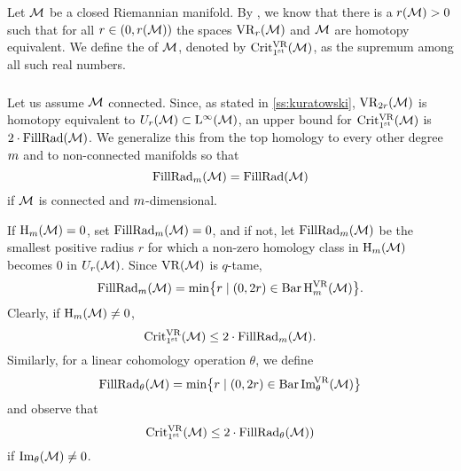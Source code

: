 \subsubsection{}\label{ss:first_critical_value}

Let \(\cM\) be a closed Riemannian manifold.
By \cite[Thm.3.5]{hausmann1995vietoris}, we know that there is a \(r(\cM) > 0\) such that for all \(r \in (0,r(\cM))\) the spaces \(\VR_r(\cM)\) and \(\cM\) are homotopy equivalent.
We define the  of \(\cM\), denoted by \(\crit(\cM)\), as the supremum among all such real numbers.


\subsubsection{}
\label{subsub:beta v.s. fillrad}

Let us assume \(\cM\) connected.
Since, as stated in \cref{ss:kuratowski}, \(\VR_{2r}(\cM)\) is homotopy equivalent to \(U_r(\cM) \subset \rL^\infty(\cM)\), an upper bound for \(\crit(\cM)\) is \(2\cdot\fillrad(\cM)\).
We generalize this from the top homology to every other degree \(\degp\) and to non-connected manifolds so that
\[
\fillrad_\degp(\cM) = \fillrad(\cM)
\]
if \(\cM\) is connected and \(\degp\)-dimensional.

If \(\rH_\degp(\cM) = 0\), set \(\fillrad_m(\cM) = 0\), and if not, let \(\fillrad_m(\cM)\) be the smallest positive radius $r$ for which a non-zero homology class in \(\rH_\degp(\cM)\) becomes \(0\) in \(U_r(\cM)\).
Since \(\VR(\cM)\) is \(q\)-tame,
\[
\fillrad_m(\cM) = \min\set[\big]{r \mid (0, 2r) \in \barc \rH^{\VR}_m(\cM)}.
\]
Clearly, if \(\rH_m(\cM) \neq 0\),
\[
\crit(\cM) \leq 2 \cdot \fillrad_m(\cM).
\]
Similarly, for a linear cohomology operation \(\theta\), we define
\[
\fillrad_\theta(\cM) = \min\set[\big]{r \mid (0, 2r) \in \barc \img_\theta^{\!\VR}(\cM)}
\]
and observe that
\[
\crit(\cM) \leq 2 \cdot \fillrad_\theta(\cM))
\]
if \(\img_\theta(\cM) \neq 0\).


